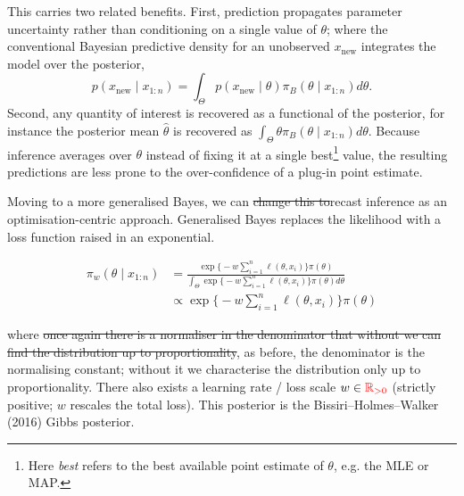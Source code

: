 \documentclass[11pt,a4paper]{article}
\newcommand{\add}[1]{{\color{red}#1}}
\newcommand{\dele}[1]{{\color{gray}\sout{#1}}}
\begin{document}
This carries two related benefits. First, prediction propagates parameter uncertainty rather than conditioning on a single value of $\theta$; where the conventional Bayesian predictive density for an unobserved $x_{\text{new}}$ integrates the model over the posterior,
\begin{equation}
    p(x_{\text{new}} \mid x_{1:n}) = \int_{\Theta} p(x_{\text{new}} \mid \theta)\pi_B(\theta \mid x_{1:n})d\theta.\label{eq:prediction}
\end{equation}
Second, any quantity of interest is recovered as a functional of the posterior, for instance the posterior mean $\hat{\theta}$ is recovered as $\int_{\Theta} \theta\pi_B(\theta \mid x_{1:n})d\theta$. Because inference averages over $\theta$ instead of fixing it at a single best\footnote{Here \emph{best} refers to the best available point estimate of $\theta$, e.g. the MLE or MAP.} value, the resulting predictions are less prone to the over-confidence of a plug-in point estimate.

Moving to a more generalised Bayes, we can \dele{change this to}\add{recast inference as} an optimisation-centric approach. Generalised Bayes replaces the likelihood with a loss function raised in an exponential.

\begin{align*}
    \pi_{w}(\theta \mid x_{1:n}) & = \frac{\exp\big\{-w\sum_{i=1}^{n}\ell(\theta, x_i)\big\}\pi(\theta)}{\displaystyle\int_{\Theta}\exp\big\{-w\sum_{i=1}^{n}\ell(\theta, x_i)\big\}\pi(\theta)d\theta} \\
                                 & \propto \exp\big\{-w\sum_{i=1}^{n}\ell(\theta, x_i)\big\}\pi(\theta)
\end{align*}

where \dele{once again there is a normaliser in the denominator that without we can find the distribution up to proportionality}\add{, as before, the denominator is the normalising constant; without it we characterise the distribution only up to proportionality}. There also exists a learning rate / loss scale $w \in {\color{red}\mathbb{R}_{>0}}$ \add{(strictly positive; $w$ rescales the total loss)}. This posterior is the Bissiri--Holmes--Walker (2016) Gibbs posterior.
\end{document}
